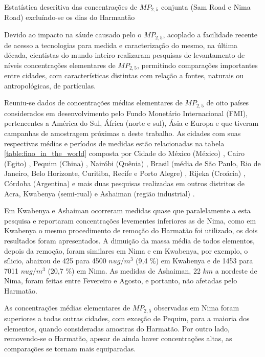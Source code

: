 \begin{table}[H]
  \centering
    
  \caption{Estatística descritiva das concentrações de $MP_{2,5}$ conjunta 
           (Sam Road e Nima Road) excluíndo-se os dias do Harmantão
            \label{table:descriptive_Fino_sH}}
\end{table}

Devido ao impacto na sáude causado pelo o $MP_{2,5}$, acoplado a facilidade 
recente de acesso a tecnologias para medida e caracterização do mesmo, 
na última década, cientistas do mundo inteiro realizaram pesquisas de 
levantamento de níveis concentrações elementares de $MP_{2,5}$, permitindo
comparações importantes entre cidades, com características distintas com 
relação a fontes, naturais ou antropológicas, de partículas.

Reuniu-se dados de concentrações médias elementares de $MP_{2,5}$ de oito 
países considerados em desenvolvimento pelo Fundo Monetário Internacional (FMI),
pertencentes a América do Sul, África (norte e sul), Ásia e Europa e que tiveram
campanhas de amostragem próximas a deste trabalho. As cidades
com suas respectivas médias e períodos de medidas estão relacionadas na 
tabela \ref{table:fino_in_the_world} composta por  
Cidade do México (México) \citep{diaz2014},
Cairo (Egito) \citep{boman2013},
Pequim (China) \citep{yang2011},
Nairóbi (Quênia)  \citep{gaita2014},
Brasil (média de São Paulo, Rio de Janeiro, Belo Horizonte, Curitiba, 
Recife e Porto Alegre)  \citep{andrade2012urban},
Rijeka (Croácia) \citep{ivovsevic2015}, 
Córdoba (Argentina) \citep{achad2014} e mais duas pesquisas realizadas em 
outros distritos de Acra, Kwabenya (semi-rual) \citep{aboh2009} e Ashaiman
(região industrial) \citep{ofosu2012}. 

Em Kwabenya e Ashaiman ocorreram medidas quase que paralelamente a esta 
pesquisa e reportaram concentrações levementes inferiores as de Nima, como
em Kwabenya o mesmo procedimento de remoção do Harmatão foi utilizado, os dois 
resultados foram apresentados. A dimuição da massa média de todos elementos,
depois da remoção, foram similares em Nima e em Kwabenya, 
por exemplo, o sílicio, abaixou de 425 para 4500 $nu g/m^3$ 
(9,4 \%) em Kwabenya e de 1453 para 7011 $nu g/m^3$ (20,7 \%) em Nima. 
As medidas de Ashaiman, 22 $km$ a nordeste de Nima, foram feitas entre 
Fevereiro e Agosto, e portanto, não afetadas pelo Harmatão. 

As concentrações médias elementares de $MP_{2,5}$ observadas em Nima foram 
superiores a todas outras cidades, com exceção de Pequim, 
para a maioria dos elementos, quando consideradas amostras do Harmatão.
Por outro lado, removendo-se o Harmatão, apesar de ainda haver concentrações
altas, as comparações se tornam mais equiparadas. 

